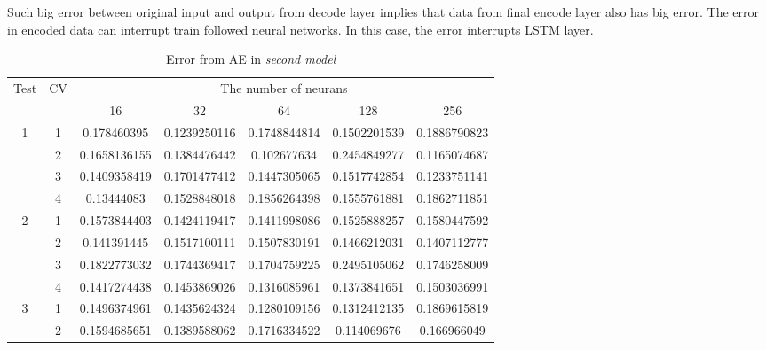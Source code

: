 \documentclass[draft,dvipsnames]{drexel-thesis}
\begin{document}
\begin{thesis}
Such big error between original input and output from decode layer implies that data from final encode layer also has big error. The error in encoded data can interrupt train followed neural networks. In this case, the error interrupts LSTM layer.


\begin{table}[!t]
\centering
\caption{Error from AE in {\em second model}}
\label{tbl:sae_error}
\begin{tabular}{|c|c|c|c|c|c|c|}
\hline
\multirow{2}{*}{Test} & \multirow{2}{*}{CV} & \multicolumn{5}{c|}{The number of neurans}                                   \\ \cline{3-7} 
                      &                     & 16            & 32            & 64            & 128           & 256          \\ \hline
\multirow{4}{*}{1}    & 1                   & 0.178460395   & 0.1239250116  & 0.1748844814  & 0.1502201539  & 0.1886790823 \\ \cline{2-7} 
                      & 2                   & 0.1658136155  & 0.1384476442  & 0.102677634   & 0.2454849277  & 0.1165074687 \\ \cline{2-7} 
                      & 3                   & 0.1409358419  & 0.1701477412  & 0.1447305065  & 0.1517742854  & 0.1233751141 \\ \cline{2-7} 
                      & 4                   & 0.13444083    & 0.1528848018  & 0.1856264398  & 0.1555761881  & 0.1862711851 \\ \hline
\multirow{4}{*}{2}    & 1                   & 0.1573844403  & 0.1424119417  & 0.1411998086  & 0.1525888257  & 0.1580447592 \\ \cline{2-7} 
                      & 2                   & 0.141391445   & 0.1517100111  & 0.1507830191  & 0.1466212031  & 0.1407112777 \\ \cline{2-7} 
                      & 3                   & 0.1822773032  & 0.1744369417  & 0.1704759225  & 0.2495105062  & 0.1746258009 \\ \cline{2-7} 
                      & 4                   & 0.1417274438  & 0.1453869026  & 0.1316085961  & 0.1373841651  & 0.1503036991 \\ \hline
\multirow{4}{*}{3}    & 1                   & 0.1496374961  & 0.1435624324  & 0.1280109156  & 0.1312412135  & 0.1869615819 \\ \cline{2-7} 
                      & 2                   & 0.1594685651  & 0.1389588062  & 0.1716334522  & 0.114069676   & 0.166966049  \\ \cline{2-7} 

\end{tabular}
\end{table}
\end{thesis}
\end{document}
